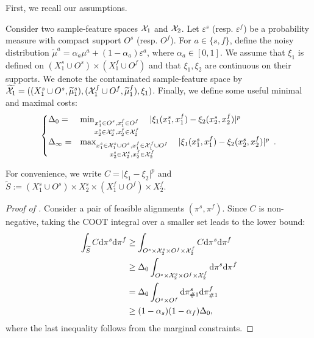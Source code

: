 First, we recall our assumptions.
\begin{assumption}
\label{assump:robust_copy}
Consider two sample-feature spaces $\mathcal X_1$ and $\mathcal X_2$.
Let $\varepsilon^s$ (resp. $\varepsilon^f$) be a probability measure with compact support $O^s$
(resp. $O^f$). For $a \in \{s, f\}$, define the noisy distribution
$\widetilde{\mu}^a = \alpha_a \mu^a + (1-\alpha_a) \varepsilon^a$, where $\alpha_a \in [0,1]$.
We assume that $\xi_1$ is defined on
$(X^s_1 \cup O^s) \times (X^f_1 \cup O^f)$ and that $\xi_1, \xi_2$
are continuous on their supports. We denote the contaminated sample-feature space by
$\widetilde{\mathcal X_1} = ((X^s_1 \cup O^s, \widetilde{\mu}^s_1),
(\mathcal X^f_1 \cup O^f, \widetilde{\mu}^f_1), \xi_1)$. Finally,
we define some useful minimal and maximal costs:
  \[
  \begin{cases}
  \Delta_{0} =& \min_{
  \substack{
       x_1^s \in O^s, x_1^f \in O^f  \\
       x_2^s \in \mathcal X_2^s, x_2^f \in \mathcal X_2^f
  }}\quad |\xi_1(x_1^s, x_1^f) - \xi_2(x_2^s, x_2^f)|^p \\
  \Delta_{\infty} =& \max_{
  \substack{
  x_1^s \in \mathcal X_1^s \cup O^s, x_1^f \in \mathcal X_1^f \cup O^f \\
  x_2^s \in \mathcal X_2^s, x_2^f \in \mathcal X_2^f
  }} \quad|\xi_1(x_1^s, x_1^f) - \xi_2(x_2^s, x_2^f)|^p \enspace.
  \end{cases}
\]
\end{assumption}
For convenience, we write $C = \vert \xi_1 - \xi_2 \vert^p$ and
$\widetilde{S} := (X^s_1 \cup O^s) \times X_2^s \times (X^f_1 \cup O^f) \times X_2^f$.
\begin{proof}[Proof of ]
Consider a pair of feasible alignments $(\pi^s, \pi^f)$. Since $C$ is non-negative,
taking the COOT integral over a smaller set leads to the lower bound:
\begin{equation}
    \begin{split}
        \int_{\widetilde{S}} C \mathrm d\pi^s\mathrm d\pi^f
        &\geq \int_{O^s \times \mathcal X_2^s \times O^f \times \mathcal X_2^f} C \mathrm d\pi^s\mathrm d\pi^f \\
          &\geq  \Delta_0 \int_{O^s \times \mathcal X_2^s \times O^f \times \mathcal X_2^f}  \mathrm d\pi^s\mathrm d\pi^f \\
          &= \Delta_0 \int_{O^s\times O^f}  \mathrm d\pi^s_{\#1} \mathrm d\pi^f_{\#1} \\
          &\geq (1 - \alpha_s)(1 -\alpha_f)\Delta_0,
    \end{split}
\end{equation}
where the last inequality follows from the marginal constraints.
\end{proof}

